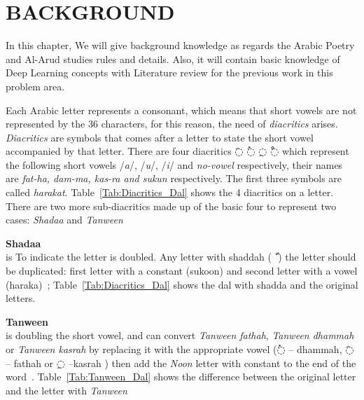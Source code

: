 \chapter{\uppercase{Background}}\label{Ch:Background}
In this chapter, We will give background knowledge as regards the Arabic Poetry and Al-Arud studies
rules and details. Also, it will contain basic knowledge of Deep Learning concepts with Literature
review for the previous work in this problem area.

Each Arabic letter represents a consonant, which means that short vowels are not
represented by the 36 characters, for this reason, the need of \textit{diacritics}
arises. \textit{Diacritics} are symbols that comes after a letter to state the
short vowel accompanied by that letter. There are four diacritics \textarabic{◌َ} \textarabic{◌ُ}
\textarabic{◌ِ} \textarabic{◌ْ} which represent the following short vowels
/\textit{a}/, /\textit{u}/, /\textit{i}/ and \textit{no-vowel} respectively,
their names are \textit{fat-ha, dam-ma, kas-ra and sukun} respectively.  The first
three symbols are called \textit{harakat}. Table~\ref{Tab:Diacritics_Dal}
shows the 4 diacritics on a letter.
There are two more sub-diacritics made up of the basic four to represent two
cases: \textit{Shadaa} and \textit{Tanween}%
\begin{definition}\label{def:shadaa_definition}
  \textbf{Shadaa}  \hfill \\
  is To indicate the letter is doubled. Any letter with shaddah (\textarabic{ ّ }) the letter should be duplicated: first letter with a constant (sukoon) and second letter with a vowel (haraka)~\cite{Alnagdawi2013}; Table~\ref{Tab:Diacritics_Dal} shows the dal with shadda and the original letters.%
\end{definition}
\begin{definition}\label{def:tanween_definition}
  \textbf{Tanween} \hfill \\
  is doubling the short vowel, and can convert \textit{Tanween fathah}, \textit{Tanween dhammah} or \textit{Tanween kasrah} by replacing it with the appropriate vowel (\textarabic{◌ُ} – dhammah, \textarabic{◌َ} – fathah or \textarabic{◌ِ} –kasrah ) then add the \textit{Noon} letter with constant to the end of the word~\cite{Alnagdawi2013}. Table~\ref{Tab:Tanween_Dal}
  shows the difference between the original letter and the letter with \textit{Tanween}%
\end{definition}%


